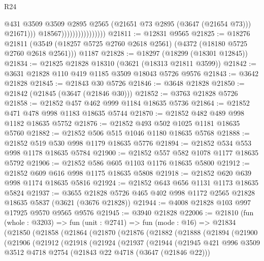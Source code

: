 \begin{lexlean}{R24}
\begin{coremodule}
                                          @431
                                          @3509
                                          @3509
                                          @2895
                                          @2565
                                          (@21651 @73 @2895 (@3647 (@21654 @73)))
                                          @21671)))
                                    @18567))))))))))))))))
@21811 := @12831 @9565
@21825 := @18276
    @21811
    (@3549 (@18257 @5725 @2760 @2618 @2561) (@4372 (@18180 @5725 @2760 @2618 @2561)))
    @1187
@21828 := @18297 (@18299 (@18301 @12845))
@21834 := @21825 @21828 @18310 (@3621 (@18313 @21811 @3599))
@21842 := @3631 @21828 @110 @419 @1185 @3509 @18043 @5726 @9576
@21843 := @3642 @21828
@21845 := @21843 @30 @5726
@21846 := @3648 @21828
@21850 := @21842 (@21845 (@3647 (@21846 @30)))
@21852 := @3763 @21828 @5726
@21858 := @21852 @457 @462 @999 @1184 @18635 @5736
@21864 := @21852 @471 @478 @998 @1183 @18635 @5744
@21870 := @21852 @482 @489 @998 @1182 @18635 @5752
@21876 := @21852 @493 @502 @1025 @1181 @18635 @5760
@21882 := @21852 @506 @515 @1046 @1180 @18635 @5768
@21888 := @21852 @519 @530 @998 @1179 @18635 @5776
@21894 := @21852 @534 @553 @998 @1178 @18635 @5784
@21900 := @21852 @557 @582 @1078 @1177 @18635 @5792
@21906 := @21852 @586 @605 @1103 @1176 @18635 @5800
@21912 := @21852 @609 @616 @998 @1175 @18635 @5808
@21918 := @21852 @620 @639 @998 @1174 @18635 @5816
@21924 := @21852 @643 @656 @1131 @1173 @18635 @5824
@21937 := @3655 @21828 @5726 @465 @402 @998 @1172 @2565 @21828 @18635 @5837 (@3621 (@3676 @21828))
@21944 := @4008 @21828 @103 @997 @17925 @9570 @9565 @9576
@21945 := @3940 @21828
@22006 := @21810
    (fun (whole : @3203) =>
    fun (unit : @2741) =>
    fun (mode : @16) =>
    @21834
      (@21850
        (@21858
          (@21864
            (@21870
              (@21876
                (@21882
                  (@21888
                    (@21894
                      (@21900
                        (@21906
                          (@21912
                            (@21918
                              (@21924
                                (@21937
                                  (@21944
                                    (@21945
                                      @421
                                      @996
                                      @3509
                                      @3512
                                      @4718
                                      @2754
                                      (@21843 @22 @4718 (@3647 (@21846 @22)))

\end{coremodule}
\end{lexlean}
